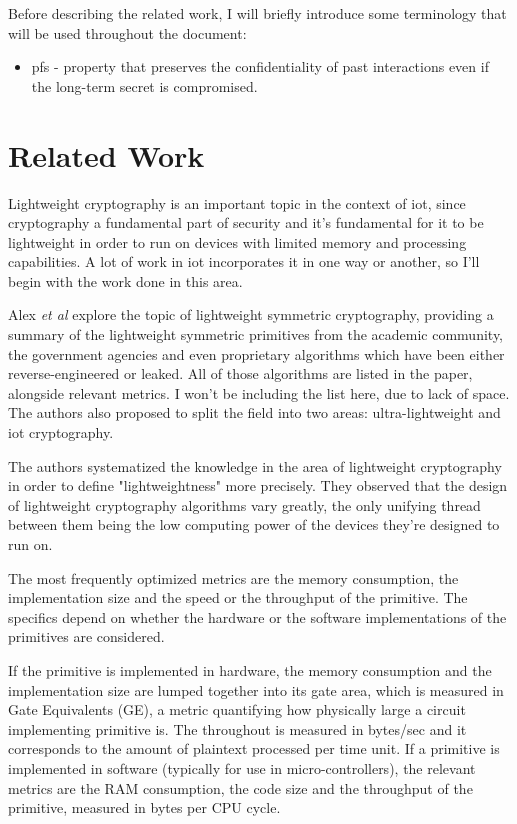 \documentclass{llncs}
\begin{document}
Before describing the related work, I will briefly introduce some terminology that will
be used throughout the document:

\begin{itemize}
  \item \gls{pfs} - property that preserves the confidentiality of past interactions
  even if the long-term secret is compromised.
\end{itemize}

\section{Related Work}

Lightweight cryptography is an important topic in the context of \gls{iot}, since
cryptography a fundamental part of security and it's fundamental for it to be
lightweight in order to run on devices with limited memory and processing
capabilities. A lot of work in \gls{iot} incorporates it in one way or another,
so I'll begin with the work done in this area.

Alex \textit{et al}\cite{Stateoft96:online} explore the topic of lightweight symmetric cryptography,
providing a summary of the lightweight symmetric
primitives from the academic community, the government agencies and even proprietary
algorithms which have been either reverse-engineered or leaked. All of those algorithms
are listed in the paper, alongside relevant metrics. I won't be including the list
here, due to lack of space. The authors also proposed
to split the field into two areas: ultra-lightweight and \gls{iot} cryptography.

The authors systematized the knowledge in the area of lightweight cryptography
in order to define "lightweightness" more precisely. They observed that the design
of lightweight cryptography algorithms vary greatly, the only unifying thread
between them being the low computing power of the devices they're designed to run on.

The most frequently optimized metrics are the memory consumption, the implementation size
and the speed or the throughput of the primitive. The specifics depend on whether
the hardware or the software implementations of the primitives are considered.

If the primitive is implemented in hardware, the memory consumption and the implementation
size are lumped together into its gate area, which is measured in Gate Equivalents (GE),
a metric quantifying how physically large a circuit implementing primitive is.
The throughout is measured in bytes/sec and it corresponds to the amount of plaintext
processed per time unit. If a primitive is implemented in software (typically for
use in micro-controllers), the relevant metrics are the RAM consumption, the code
size and the throughput of the primitive, measured in bytes per CPU cycle.
\end{document}
